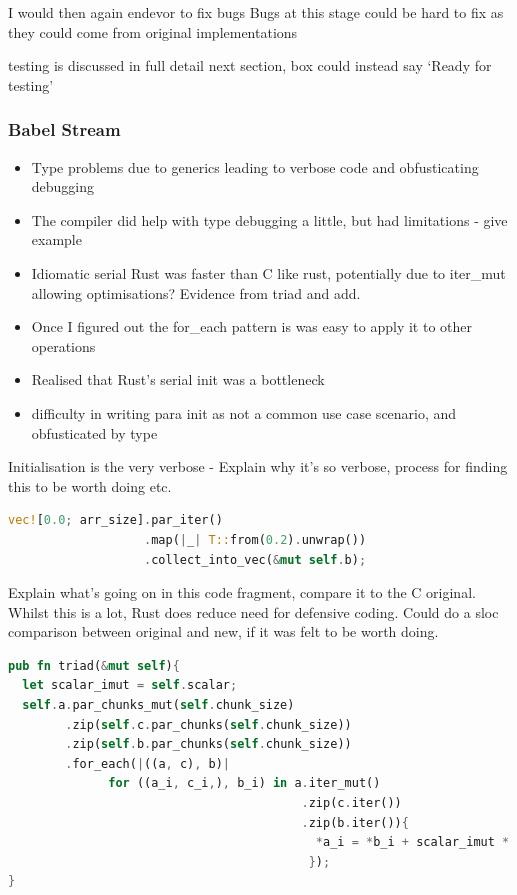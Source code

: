 I would then again endevor to fix bugs Bugs at this stage could be hard to fix as they could come from original implementations

testing is discussed in full detail next section, box could instead say `Ready for testing'

\subsubsection{Babel Stream}
\begin{itemize}
  \item Type problems due to generics leading to verbose code and obfusticating debugging
  \item The compiler did help with type debugging a little, but had limitations - give example
  \item Idiomatic serial Rust was faster than C like rust, potentially due to iter\_mut allowing optimisations? Evidence from triad and add.
  \item Once I figured out the for\_each pattern is was easy to apply it to other operations
  \item Realised that Rust's serial init was a bottleneck
  \item difficulty in writing para init as not a common use case scenario, and obfusticated by type
\end{itemize}

Initialisation is the very verbose - Explain why it's so verbose, process for finding this to be worth doing etc.
\begin{lstlisting}[language=Rust]
vec![0.0; arr_size].par_iter()
                   .map(|_| T::from(0.2).unwrap())
                   .collect_into_vec(&mut self.b);
\end{lstlisting}

Explain what's going on in this code fragment, compare it to the C original. Whilst this is a lot, Rust does reduce need for defensive coding. Could do a sloc comparison between original and new, if it was felt to be worth doing.

\begin{lstlisting}[language=Rust]
pub fn triad(&mut self){
  let scalar_imut = self.scalar;
  self.a.par_chunks_mut(self.chunk_size)
        .zip(self.c.par_chunks(self.chunk_size))
        .zip(self.b.par_chunks(self.chunk_size))
        .for_each(|((a, c), b)|
              for ((a_i, c_i,), b_i) in a.iter_mut()
                                         .zip(c.iter())
                                         .zip(b.iter()){
                                           *a_i = *b_i + scalar_imut * *c_i
                                          });
}
\end{lstlisting}


